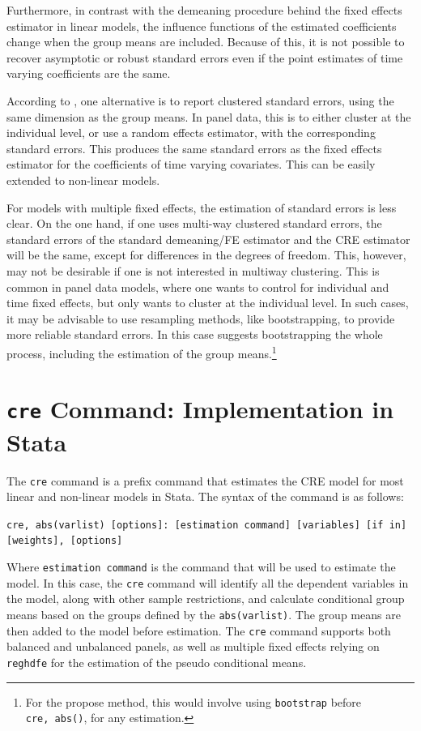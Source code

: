 \documentclass[bib]{statapress}
\begin{document}
Furthermore, in contrast with the demeaning procedure behind the fixed
effects estimator in linear models, the influence functions of the
estimated coefficients change when the group means are included. Because
of this, it is not possible to recover asymptotic or robust standard
errors even if the point estimates of time varying coefficients are the
same.

According to \citet{wooldridge2010econometric}, one alternative is to
report clustered standard errors, using the same dimension as the group
means. In panel data, this is to either cluster at the individual level,
or use a random effects estimator, with the corresponding standard
errors. This produces the same standard errors as the fixed effects
estimator for the coefficients of time varying covariates. This can be
easily extended to non-linear models.

For models with multiple fixed effects, the estimation of standard
errors is less clear. On the one hand, if one uses multi-way clustered
standard errors, the standard errors of the standard demeaning/FE
estimator and the CRE estimator will be the same, except for differences
in the degrees of freedom. This, however, may not be desirable if one is
not interested in multiway clustering. This is common in panel data
models, where one wants to control for individual and time fixed
effects, but only wants to cluster at the individual level. In such
cases, it may be advisable to use resampling methods, like
bootstrapping, to provide more reliable standard errors. In this case
\citet{wooldridge2010econometric} suggests bootstrapping the whole
process, including the estimation of the group means.\footnote{For the
  propose method, this would involve using \texttt{bootstrap} before
  \texttt{cre,\ abs()}, for any estimation.}

\section{\texorpdfstring{\texttt{cre} Command: Implementation in
Stata}{cre Command: Implementation in Stata}}\label{sec-3}

The \texttt{cre} command is a prefix command that estimates the CRE
model for most linear and non-linear models in Stata. The syntax of the
command is as follows:

\texttt{cre,\ abs(varlist)\ {[}options{]}:\ {[}estimation\ command{]}\ {[}variables{]}\ {[}if\ in{]}\ {[}weights{]},\ {[}options{]}}

Where \texttt{estimation\ command} is the command that will be used to
estimate the model. In this case, the \texttt{cre} command will identify
all the dependent variables in the model, along with other sample
restrictions, and calculate conditional group means based on the groups
defined by the \texttt{abs(varlist)}. The group means are then added to
the model before estimation. The \texttt{cre} command supports both
balanced and unbalanced panels, as well as multiple fixed effects
relying on \texttt{reghdfe} for the estimation of the pseudo conditional
means.
\end{document}
